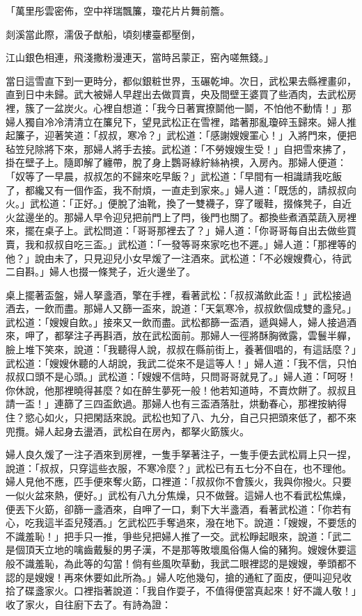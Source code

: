 「萬里彤雲密佈，空中祥瑞飄簾，瓊花片片舞前簷。

剡溪當此際，濡伋子猷船，頃刻樓臺都壓倒，

江山銀色相連，飛淺撒粉漫連天，當時呂蒙正，窑內嗟無錢。」

當日這雪直下到一更時分，都似銀粧世界，玉碾乾坤。次日，武松果去縣裡畫卯，直到日中未歸。武大被婦人早趕出去做買賣，央及間壁王婆買了些酒肉，去武松房裡，簇了一盆炭火。心裡自想道：「我今日著實撩鬬他一鬬，不怕他不動情！」那婦人獨自冷冷清清立在簾兒下，望見武松正在雪裡，踏著那亂瓊碎玉歸來。婦人推起簾子，迎著笑道：「叔叔，寒冷？」武松道：「感謝嫂嫂罣心！」入將門來，便把毡笠兒除將下來，那婦人將手去接。武松道：「不勞嫂嫂生受！」自把雪來拂了，掛在壁子上。隨即解了纏帶，脫了身上鸚哥綠紵絲衲襖，入房內。那婦人便道：「奴等了一早晨，叔叔怎的不歸來吃早飯？」武松道：「早間有一相識請我吃飯了，都纔又有一個作盃，我不耐煩，一直走到家來。」婦人道：「既恁的，請叔叔向火。」武松道：「正好。」便脫了油靴，換了一雙襪子，穿了暖鞋，掇條凳子，自近火盆邊坐的。那婦人早令迎兒把前門上了閂，後門也關了。都換些煮酒菜蔬入房裡來，擺在桌子上。武松問道：「哥哥那裡去了？」婦人道：「你哥哥每自出去做些買賣，我和叔叔自吃三盃。」武松道：「一發等哥來家吃也不遲。」婦人道：「那裡等的他？」說由未了，只見迎兒小女早煖了一注酒來。武松道：「不必嫂嫂費心，待武二自斟。」婦人也掇一條凳子，近火邊坐了。

桌上擺著盃盤，婦人拏盞酒，擎在手裡，看著武松：「叔叔滿飲此盃！」武松接過酒去，一飲而盡。那婦人又篩一盃來，說道：「天氣寒冷，叔叔飲個成雙的盞兒。」武松道：「嫂嫂自飲。」接來又一飲而盡。武松都篩一盃酒，遞與婦人，婦人接過酒來，呷了，都拏注子再斟酒，放在武松面前。那婦人一徑將酥胸微露，雲鬟半軃，臉上堆下笑來，說道：「我聽得人說，叔叔在縣前街上，養著個唱的，有這話麼？」武松道：「嫂嫂休聽的人胡說，我武二從來不是這等人！」婦人道：「我不信，只怕叔叔口頭不是心頭。」武松道：「嫂嫂不信時，只問哥哥就見了。」婦人道：「呵呀！你休說，他那裡曉得甚麼？如在醉生夢死一般！他若知道時，不賣炊餅了。叔叔且請一盃！」連篩了三四盃飲過。那婦人也有三盃酒落肚，烘動春心，那裡按納得住？慾心如火，只把閑話來說。武松也知了八、九分，自己只把頭來低了，都不來兜攬。婦人起身去盪酒，武松自在房內，都拏火筯簇火。

婦人良久煖了一注子酒來到房裡，一隻手拏著注子，一隻手便去武松肩上只一捏，說道：「叔叔，只穿這些衣服，不寒冷麼？」武松已有五七分不自在，也不理他。婦人見他不應，匹手便來奪火筯，口裡道：「叔叔你不會簇火，我與你撥火。只要一似火盆來熱，便好。」武松有八九分焦燥，只不做聲。這婦人也不看武松焦燥，便丟下火筯，卻篩一盞酒來，自呷了一口，剩下大半盞酒，看著武松道：「你若有心，吃我這半盃兒殘酒。」乞武松匹手奪過來，潑在地下。說道：「嫂嫂，不要恁的不識羞恥！」把手只一推，爭些兒把婦人推了一交。武松睜起眼來，說道：「武二是個頂天立地的噙齒戴髮的男子漢，不是那等敗壞風俗傷人倫的豬狗。嫂嫂休要這般不識羞恥，為此等的勾當！倘有些風吹草動，我武二眼裡認的是嫂嫂，拳頭都不認的是嫂嫂！再來休要如此所為。」婦人吃他幾句，搶的通紅了面皮，便叫迎兒收拾了碟盞家火。口裡指著說道：「我自作耍子，不值得便當真起來！好不識人敬！」收了家火，自往廚下去了。有詩為證：

